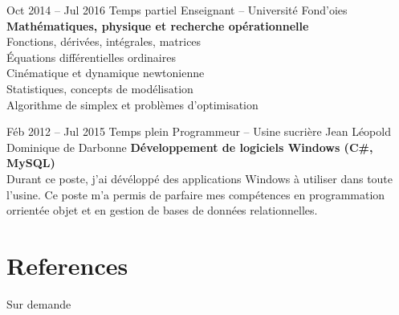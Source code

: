 \documentclass[
	10pt, %
]{FreemanCV}
\begin{document}
\begin{paracol}{2}
\jobentry
	{Oct 2014 -- Jul 2016} %
	{Temps partiel} %
	{Enseignant -- Université Fond'oies} %
	{}
	{\textbf{Mathématiques, physique et recherche opérationnelle}}\\
	{
		Fonctions, dérivées, intégrales, matrices \\
		Équations différentielles ordinaires\\
		Cinématique et dynamique newtonienne\\
		Statistiques, concepts de modélisation\\
		Algorithme de simplex et problèmes d’optimisation
	}
\medskip %
\medskip %

\jobentry
	{Féb 2012 -- Jul 2015} %
	{Temps plein} %
	{Programmeur -- Usine sucrière Jean Léopold Dominique de Darbonne} %
	{}
	{\textbf{Développement de logiciels Windows (C\#, MySQL)}}\\
	{
		Durant ce poste, j'ai d\'ev\'elopp\'e des applications Windows \`a utiliser dans toute l'usine. Ce poste m'a permis de parfaire mes comp\'etences en programmation orrient\'ee objet et en gestion de bases de donn\'ees relationnelles. 
	}
\medskip %
\medskip %





\section{References}

Sur demande

\comment{



}
\end{paracol}
\end{document}
